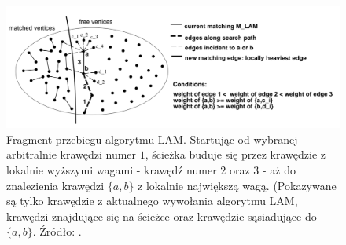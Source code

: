 \begin{figure}[h]
    \centering
    \includegraphics[width=0.9\linewidth]{images/lam}
    \caption{Fragment przebiegu algorytmu LAM. Startując od wybranej arbitralnie krawędzi numer $1$, ścieżka buduje się
    przez krawędzie z lokalnie wyższymi wagami - krawędź numer $2$ oraz $3$ -
    aż do znalezienia krawędzi \(\{a, b\}\) z lokalnie największą wagą. (Pokazywane są tylko krawędzie z aktualnego
    wywołania algorytmu LAM, krawędzi znajdujące się na ścieżce oraz krawędzie sąsiadujące do \(\{a, b\}\).
    Źródło: \cite{weighted_maching}.}
    \label{im:lam}
\end{figure}

